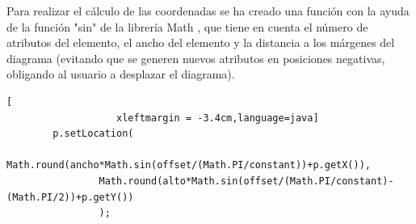 \begin{itemize}
\begin{itemize}
        Para realizar el cálculo de las coordenadas se ha creado una función con la ayuda de la función "sin" de la librería Math \cite{math}, que tiene en cuenta el número de atributos del elemento, el ancho del elemento y la distancia a los márgenes del diagrama (evitando que se generen nuevos atributos en posiciones negativas, obligando al usuario a desplazar el diagrama).\\
        
        \begin{lstlisting}[
                   xleftmargin = -3.4cm,language=java]
        p.setLocation(
				Math.round(ancho*Math.sin(offset/(Math.PI/constant))+p.getX()), 
				Math.round(alto*Math.sin(offset/(Math.PI/constant)-(Math.PI/2))+p.getY())
				);
        \end{lstlisting}
    \end{itemize}
\end{itemize}
